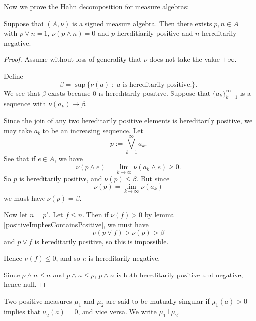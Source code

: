 \documentclass{owmaths}
\begin{document}
Now we prove the Hahn decomposition for measure algebras:
\begin{proposition}
    Suppose that $(A,\nu)$ is a signed measure algebra. Then there
    exists $p,n \in A$ with $p \vee n = 1$, $\nu(p \wedge n) = 0$
    and $p$ hereditiarily positive and $n$ hereditarily negative.
\end{proposition}
\begin{proof}
    Assume without loss of generality that $\nu$ does not take the value $+\infty$.
    
    Define
    \begin{equation*}
        \beta = \sup\{\nu(a)\;:\;a\text{ is hereditarily positive.}\}.
    \end{equation*}
    We see that $\beta$ exists because $0$ is hereditarily positive. Suppose
    that $\{a_k\}_{k=1}^\infty$ is a sequence with $\nu(a_k)\rightarrow\beta$.
    
    Since the join of any two hereditarily positive elements is
    hereditarily positive, we may take $a_k$ to be an increasing sequence. 
    Let 
    \begin{equation*}
        p := \bigvee_{k=1}^\infty a_k.
    \end{equation*}
    See that if $e \in A$, we have 
    \begin{equation*}
        \nu(p\wedge e) = \lim_{k\rightarrow\infty} \nu(a_k\wedge e) \geq 0.
    \end{equation*}
    So $p$ is hereditarily positive, and $\nu(p) \leq \beta$. But since
    \begin{equation*}
        \nu(p) = \lim_{k\rightarrow\infty} \nu(a_k)
    \end{equation*}
    we must have $\nu(p) = \beta$.
    
    Now let $n = p'$. Let $f \leq n$. Then if $\nu(f) > 0$ by lemma \ref{positiveImpliesContainsPositive}, we must have
    \begin{equation*}
        \nu(p\vee f) > \nu(p) > \beta
    \end{equation*}
    and $p \vee f$ is hereditarily positive, so this is impossible. 
    
    Hence $\nu(f) \leq 0$, and so $n$ is hereditarily negative.
    
    Since $p \wedge n \leq n$ and $p \wedge n \leq p$, $p\wedge n$
    is both hereditarily positive and negative, hence null.
\end{proof}

Two positive measures $\mu_1$
and $\mu_2$ are said to be mutually singular if $\mu_1(a) > 0$
implies that $\mu_2(a) = 0$, and vice versa. We write $\mu_1 \bot \mu_2$.
\end{document}
